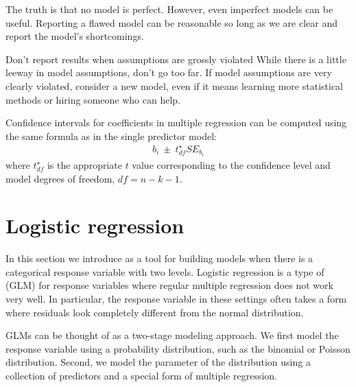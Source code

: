 \begin{tipBox}{
The truth is that no model is perfect. However, even imperfect models can be useful. Reporting a flawed model can be reasonable so long as we are clear and report the model's shortcomings.}
\end{tipBox}

\begin{caution}
{Don't report results when assumptions are grossly violated}
{While there is a little leeway in model assumptions, don't go too far. If model assumptions are very clearly violated, consider a new model, even if it means learning more statistical methods or hiring someone who can help.}
\end{caution}

\begin{tipBox}{
Confidence intervals for coefficients in multiple regression can be computed using the same formula as in the single predictor model:
\begin{align*}
b_i \ \pm\ t_{df}^{\star}SE_{b_{i}}
\end{align*}
where $t_{df}^{\star}$ is the appropriate $t$ value corresponding to the confidence level and model degrees of freedom, $df=n-k-1$.}
\end{tipBox}


\section{Logistic regression}
\label{logisticRegression}


In this section we introduce  as a tool for building models when there is a categorical response variable with two levels. Logistic regression is a type of  (GLM) for response variables where regular multiple regression does not work very well. In particular, the response variable in these settings often takes a form where residuals look completely different from the normal distribution.

GLMs can be thought of as a two-stage modeling approach. We first model the response variable using a probability distribution, such as the binomial or Poisson distribution. Second, we model the parameter of the distribution using a collection of predictors and a special form of multiple regression.

